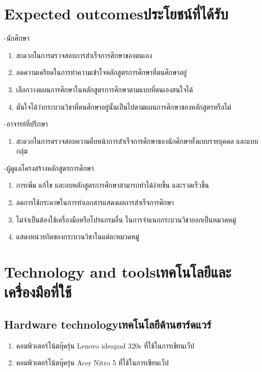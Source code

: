 \section{\ifenglish Expected outcomes\else ประโยชน์ที่ได้รับ\fi}
-นักศึกษา 

\begin{enumerate}
    \item สะดวกในการตรวจสอบการสำเร็จการศึกษาของตนเอง 
    \item ลดความเครียดในการทำความเข้าใจหลักสูตรการศึกษาที่ตนศึกษาอยู่ 
    \item เลือกวางแผนการศึกษาในหลักสูตรการศึกษาตามแบบที่ตนเองสนใจได้
    \item มั่นใจได้ว่ากระบวนวิชาที่ตนศึกษาอยู่นั้นเป็นไปตามแผนการศึกษาของหลักสูตรหรือไม่ 
    
\end{enumerate}

-อาจารย์ที่ปรึกษา 

\begin{enumerate}
    \item สะดวกในการตรวจสอบความคืบหน้าการสำเร็จการศึกษาของนักศึกษาทั้งแบบรายบุคคล และแบบกลุ่ม 
\end{enumerate}

-ผู้ดูแลโครงสร้างหลักสูตรการศึกษา

\begin{enumerate}
    \item การเพิ่ม แก้ไข และลบหลักสูตรการศึกษาสามารถทำได้ง่ายขึ้น  และรวดเร็วขึ้น
    \item ลดการใช้กระดาษในการทำเอกสารแสดงผลการสำเร็จการศึกษา 
    \item ไม่จำเป็นต้องใช้เครื่องมือหรือโปรแกรมอื่น ในการจำแนกกระบวนวิชาออกเป็นหมวดหมู่ 
    \item แสดงหน่วยกิตของกระบวนวิชาในแต่ละหมวดหมู่
    
\end{enumerate}

\section{\ifenglish Technology and tools\else เทคโนโลยีและเครื่องมือที่ใช้\fi}

\subsection{\ifenglish Hardware technology\else เทคโนโลยีด้านฮาร์ดแวร์\fi}

\begin{enumerate}
    \item คอมพิวเตอร์โน้ตบุ๊ครุ่น Lenovo ideapad 320s ที่ใช้ในการเขียนเว็ป
    \item คอมพิวเตอร์โน้ตบุ๊ครุ่น Acer Nitro 5  ที่ใช้ในการเขียนเว็ป
\end{enumerate}

